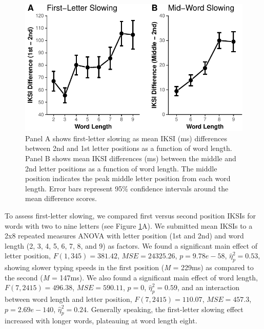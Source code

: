 \documentclass[,man,floatsintext]{apa6}
\begin{document}
\begin{figure}
\centering
\includegraphics{v2-manuscript_files/figure-latex/figure2-1.pdf}
\caption{\label{fig:figure2}Panel A shows first-letter slowing as mean IKSI (ms) differences between 2nd and 1st letter positions as a function of word length. Panel B shows mean IKSI differences (ms) between the middle and 2nd letter positions as a function of word length. The middle position indicates the peak middle letter position from each word length. Error bars represent 95\% confidence intervals around the mean difference scores.}
\end{figure}



To assess first-letter slowing, we compared first versus second position IKSIs for words with two to nine letters (see Figure \ref{fig:figure2}A). We submitted mean IKSIs to a 2x8 repeated measures ANOVA with letter position (1st and 2nd) and word length (2, 3, 4, 5, 6, 7, 8, and 9) as factors. We found a significant main effect of letter position, \(F(1, 345) = 381.42\), \(\mathit{MSE} = 24325.26\), \(p = 9.78e-58\), \(\hat{\eta}^2_\textit{p} = 0.53\), showing slower typing speeds in the first position (\textit{M} = 229ms) as compared to the second (\textit{M} = 147ms). We also found a significant main effect of word length, \(F(7, 2415) = 496.38\), \(\mathit{MSE} = 590.11\), \(p = 0\), \(\hat{\eta}^2_\textit{p} = 0.59\), and an interaction between word length and letter position, \(F(7, 2415) = 110.07\), \(\mathit{MSE} = 457.3\), \(p = 2.69e-140\), \(\hat{\eta}^2_\textit{p} = 0.24\). Generally speaking, the first-letter slowing effect increased with longer words, plateauing at word length eight.
\end{document}

